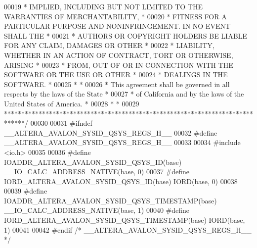 \begin{DoxyCode}
00019 \textcolor{comment}{* IMPLIED, INCLUDING BUT NOT LIMITED TO THE WARRANTIES OF MERCHANTABILITY,    *}
00020 \textcolor{comment}{* FITNESS FOR A PARTICULAR PURPOSE AND NONINFRINGEMENT. IN NO EVENT SHALL THE *}
00021 \textcolor{comment}{* AUTHORS OR COPYRIGHT HOLDERS BE LIABLE FOR ANY CLAIM, DAMAGES OR OTHER      *}
00022 \textcolor{comment}{* LIABILITY, WHETHER IN AN ACTION OF CONTRACT, TORT OR OTHERWISE, ARISING     *}
00023 \textcolor{comment}{* FROM, OUT OF OR IN CONNECTION WITH THE SOFTWARE OR THE USE OR OTHER         *}
00024 \textcolor{comment}{* DEALINGS IN THE SOFTWARE.                                                   *}
00025 \textcolor{comment}{*                                                                             *}
00026 \textcolor{comment}{* This agreement shall be governed in all respects by the laws of the State   *}
00027 \textcolor{comment}{* of California and by the laws of the United States of America.              *}
00028 \textcolor{comment}{*                                                                             *}
00029 \textcolor{comment}{******************************************************************************/}
00030 
00031 \textcolor{preprocessor}{#ifndef \_\_ALTERA\_AVALON\_SYSID\_QSYS\_REGS\_H\_\_}
00032 \textcolor{preprocessor}{#define \_\_ALTERA\_AVALON\_SYSID\_QSYS\_REGS\_H\_\_}
00033 
00034 \textcolor{preprocessor}{#include <io.h>}
00035 
00036 \textcolor{preprocessor}{#define IOADDR\_ALTERA\_AVALON\_SYSID\_QSYS\_ID(base)         \_\_IO\_CALC\_ADDRESS\_NATIVE(base, 0)}
00037 \textcolor{preprocessor}{#define IORD\_ALTERA\_AVALON\_SYSID\_QSYS\_ID(base)           IORD(base, 0)}
00038 
00039 \textcolor{preprocessor}{#define IOADDR\_ALTERA\_AVALON\_SYSID\_QSYS\_TIMESTAMP(base)  \_\_IO\_CALC\_ADDRESS\_NATIVE(base, 1)}
00040 \textcolor{preprocessor}{#define IORD\_ALTERA\_AVALON\_SYSID\_QSYS\_TIMESTAMP(base)    IORD(base, 1)}
00041 
00042 \textcolor{preprocessor}{#endif }\textcolor{comment}{/* \_\_ALTERA\_AVALON\_SYSID\_QSYS\_REGS\_H\_\_ */}\textcolor{preprocessor}{}
\end{DoxyCode}
